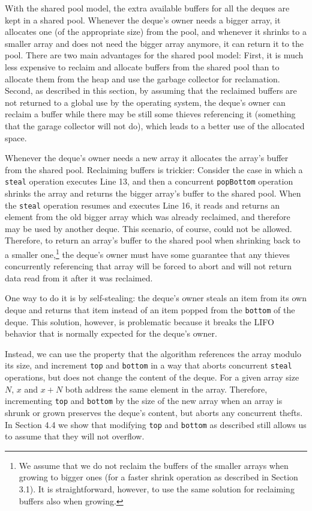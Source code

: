 With the shared pool model, the extra available buffers for all the
deques are kept in a shared pool. Whenever the deque's owner needs a
bigger array, it allocates one (of the appropriate size) from the
pool, and whenever it shrinks to a smaller array and does not need the
bigger array anymore, it can return it to the pool. There are two main
advantages for the shared pool model: First, it is much less expensive
to reclaim and allocate buffers from the shared pool than to allocate
them from the heap and use the garbage collector for
reclamation. Second, as described in this section, by assuming that
the reclaimed buffers are not returned to a global use by the
operating system, the deque's owner can reclaim a buffer while there
may be still some thieves referencing it (something that the garage
collector will not do), which leads to a better use of the allocated
space.


Whenever the deque's owner needs a new array it allocates the array's
buffer from the shared pool. Reclaiming buffers is trickier: Consider
the case in which a \lstinline!steal! operation executes Line 13, and
then a concurrent \lstinline!popBottom! operation shrinks the array
and returns the bigger array's buffer to the shared pool. When the
\lstinline!steal! operation resumes and executes Line 16, it reads and
returns an element from the old bigger array which was already
reclaimed, and therefore may be used by another deque. This scenario,
of course, could not be allowed. Therefore, to return an array's
buffer to the shared pool when shrinking back to a smaller
one,\footnote{We assume that we do not reclaim the buffers of the
  smaller arrays when growing to bigger ones (for a faster shrink
  operation as described in Section 3.1). It is straightforward,
  however, to use the same solution for reclaiming buffers also when
  growing.} the deque's owner must have some guarantee that any
thieves concurrently referencing that array will be forced to abort
and will not return data read from it after it was reclaimed.

One way to do it is by self-stealing: the deque's owner steals an item
from its own deque and returns that item instead of an item popped
from the \lstinline!bottom! of the deque. This solution, however, is
problematic because it breaks the LIFO behavior that is normally
expected for the deque's owner.

Instead, we can use the property that the algorithm references the
array modulo its size, and increment \lstinline!top! and
\lstinline!bottom! in a way that aborts concurrent \lstinline!steal!
operations, but does not change the content of the deque. For a given
array size $N$, $x$ and $x + N$ both address the same element in the
array. Therefore, incrementing \lstinline!top! and \lstinline!bottom!
by the size of the new array when an array is shrunk or grown
preserves the deque's content, but aborts any concurrent thefts. In
Section 4.4 we show that modifying \lstinline!top! and
\lstinline!bottom! as described still allows us to assume that they
will not overflow.

